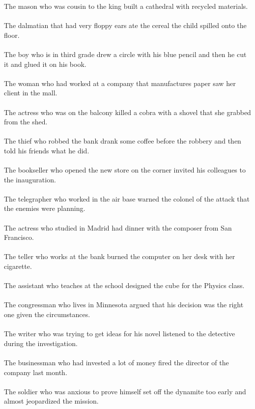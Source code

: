 The mason who was cousin to the king built a cathedral with recycled materials.	\\	\\
The dalmatian that had very floppy ears ate the cereal the child spilled onto the floor.	\\	\\
The boy who is in third grade drew a circle with his blue pencil and then he cut it and glued it on his book.	\\	\\
The woman who had worked at a company that manufactures paper saw her client in the mall.	\\	\\
The actress who was on the balcony killed a cobra with a shovel that she grabbed from the shed.	\\	\\
The thief who robbed the bank drank some coffee before the robbery and then told his friends what he did.	\\	\\
The bookseller who opened the new store on the corner invited his colleagues to the inauguration.	\\	\\
The telegrapher who worked in the air base warned the colonel of the attack that the enemies were planning.	\\	\\
The actress who studied in Madrid had dinner with the composer from San Francisco.	\\	\\
The teller who works at the bank burned the computer on her desk with her cigarette.	\\	\\
The assistant who teaches at the school designed the cube for the Physics class.	\\	\\
The congressman who lives in Minnesota argued that his decision was the right one given the circumstances.	\\	\\
The writer who was trying to get ideas for his novel listened to the detective during the investigation.	\\	\\
The businessman who had invested a lot of money fired the director of the company  last month.	\\	\\
The soldier who was anxious to prove himself set off the dynamite too early and almost jeopardized the mission.	\\	\\
